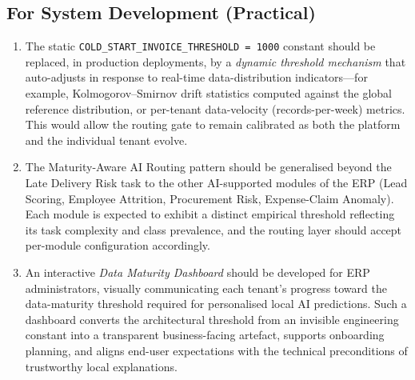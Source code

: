 \subsection{For System Development (Practical)}
\label{subsec:system-development}

\begin{enumerate}
    \item The static \texttt{COLD\_START\_INVOICE\_THRESHOLD = 1000}
    constant should be replaced, in production deployments, by a
    \emph{dynamic threshold mechanism} that auto-adjusts in response to
    real-time data-distribution indicators---for example,
    Kolmogorov--Smirnov drift statistics computed against the global
    reference distribution, or per-tenant data-velocity
    (records-per-week) metrics. This would allow the routing gate to
    remain calibrated as both the platform and the individual tenant
    evolve.
    \item The Maturity-Aware AI Routing pattern should be generalised
    beyond the Late Delivery Risk task to the other AI-supported modules of the
    ERP (Lead Scoring, Employee Attrition, Procurement Risk,
    Expense-Claim Anomaly). Each module is expected to exhibit a distinct
    empirical threshold reflecting its task complexity and class
    prevalence, and the routing layer should accept per-module
    configuration accordingly.
    \item An interactive \emph{Data Maturity Dashboard} should be
    developed for ERP administrators, visually communicating each
    tenant's progress toward the data-maturity threshold required for
    personalised local AI predictions. Such a dashboard converts the
    architectural threshold from an invisible engineering constant into a
    transparent business-facing artefact, supports onboarding planning,
    and aligns end-user expectations with the technical preconditions of
    trustworthy local explanations.
\end{enumerate}
